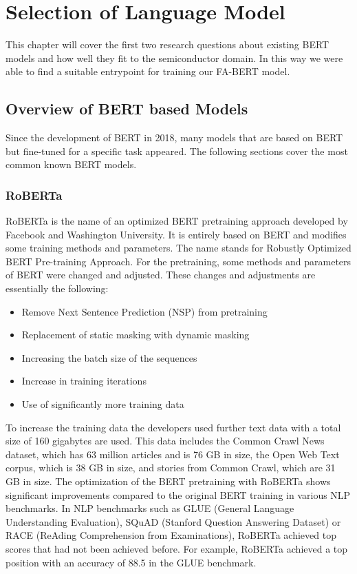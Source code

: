 \chapter{Selection of Language Model} \label{chapter:analysis}
This chapter will cover the first two research questions about existing BERT models and how well they fit to the semiconductor domain. In this way we were able to find a suitable entrypoint for training our FA-BERT model.

\section{Overview of BERT based Models}
Since the development of BERT in 2018, many models that are based on BERT but fine-tuned for a specific task appeared. The following sections cover the most common known BERT models.

\subsection{RoBERTa}
RoBERTa is the name of an optimized BERT pretraining approach developed by Facebook and Washington University. It is entirely based on BERT and modifies some training methods and parameters. The name stands for Robustly Optimized BERT Pre-training Approach. For the pretraining, some methods and parameters of BERT were changed and adjusted. These changes and adjustments are essentially the following:

\begin{itemize}
	\item Remove Next Sentence Prediction (NSP) from pretraining
	\item Replacement of static masking with dynamic masking
	\item Increasing the batch size of the sequences
	\item Increase in training iterations
	\item Use of significantly more training data
\end{itemize}

To increase the training data the developers used further text data with a total size of 160 gigabytes are used. This data includes the Common Crawl News dataset, which has 63 million articles and is 76 GB in size, the Open Web Text corpus, which is 38 GB in size, and stories from Common Crawl, which are 31 GB in size. \newline
The optimization of the BERT pretraining with RoBERTa shows significant improvements compared to the original BERT training in various NLP benchmarks. In NLP benchmarks such as GLUE (General Language Understanding Evaluation), SQuAD (Stanford Question Answering Dataset) or RACE (ReAding Comprehension from Examinations), RoBERTa achieved top scores that had not been achieved before. For example, RoBERTa achieved a top position with an accuracy of 88.5 in the GLUE benchmark.


